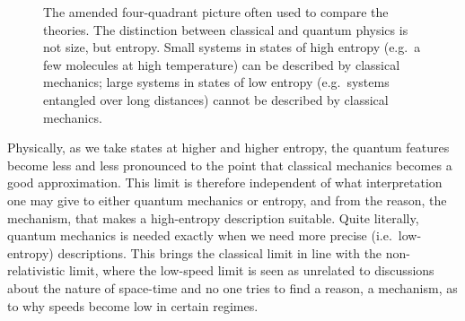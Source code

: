 \documentclass{article}
\begin{document}
\begin{figure}[h]
	\centering
{}
	\caption {The amended four-quadrant picture often used to compare the theories. The distinction between classical and quantum physics is not size, but entropy. Small systems in states of high entropy (e.g.~a few molecules at high temperature) can be described by classical mechanics; large systems in states of low entropy (e.g.~systems entangled over long distances) cannot be described by classical mechanics. } \label{fig_quadrants}
\end{figure}

Physically, as we take states at higher and higher entropy, the quantum features become less and less pronounced to the point that classical mechanics becomes a good approximation. This limit is therefore independent of what interpretation one may give to either quantum mechanics or entropy, and from the reason, the mechanism, that makes a high-entropy description suitable. Quite literally, quantum mechanics is needed exactly when we need more precise (i.e.~low-entropy) descriptions. This brings the classical limit in line with the non-relativistic limit, where the low-speed limit is seen as unrelated to discussions about the nature of space-time and no one tries to find a reason, a mechanism, as to why speeds become low in certain regimes.
\end{document}
